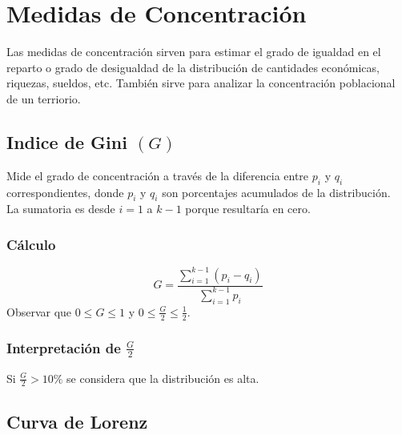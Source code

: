 \section{Medidas de Concentración}
Las medidas de concentración sirven para estimar el grado de igualdad en el reparto o grado de desigualdad de la distribución de cantidades económicas, riquezas, sueldos, etc. También sirve para analizar la concentración poblacional de un terriorio.
\subsection{Indice de Gini $(G)$}
Mide el grado de concentración a través de la diferencia entre $p_i$ y $q_i$ correspondientes, donde $p_i$ y $q_i$ son porcentajes acumulados de la distribución.\\${ }$\\La sumatoria es desde $i=1$ a $k-1$ porque resultaría en cero.
\subsubsection{Cálculo}
$$G=\dfrac{\displaystyle\sum_{i=1}^{k-1}(p_i-q_i)}{\displaystyle\sum_{i=1}^{k-1}p_i}$$
Observar que $0\leq G \leq 1$ y $0\leq\frac{G}{2}\leq \frac{1}{2}$.
\subsubsection{Interpretación de $\frac{G}{2}$}
Si $\frac{G}{2}>10\%$ se considera que la distribución es alta.
\subsection{Curva de Lorenz}
\begin{center}
\end{center}
